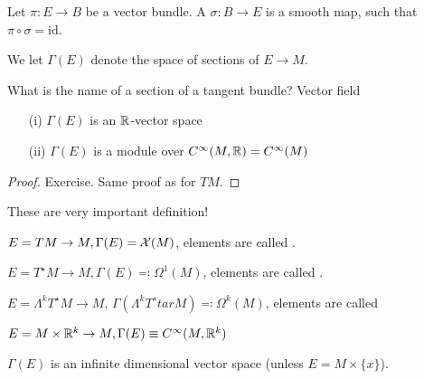 \begin{definition*}
    Let \(\pi:E\to B\) be a vector bundle. A  \(\sigma:B\to E\) is a 
    smooth map, such that \(\pi\circ \sigma=\text{id}\).
\end{definition*}
We let \(\Gamma(E)\) denote the space of sections of \(E \to M\). 

What is the name of a section of a tangent bundle? Vector field %

\begin{lemma}\label{lem:8.5}
    \begin{enumerate}
        \item[(i)] \(\Gamma(E)\) is an \(\mathbb{R}\)-vector space 
        \item[(ii)] \(\Gamma(E)\) is a module over \(C^\infty(M,\mathbb{R})=C^\infty(M)\)  
    \end{enumerate}
\end{lemma}

\begin{proof}
    Exercise. Same proof as for \(TM\).
\end{proof}

These are very important definition!

\begin{example}
    \(E=TM\to M,\Gamma(E)=\mathcal{X}(M)\), elements are called .
\end{example}

\begin{example}
    \(E=T^\star M\to M,\Gamma(E)\eqqcolon \Omega^1(M)\), elements are called .
\end{example}

\begin{example}
    \(E=\Lambda^k T^\star M \to M\), \(\Gamma(\Lambda^k T^star M)\eqqcolon \Omega^k(M)\), elements are called 
\end{example}

\begin{example}
    \(E=M\times \mathbb{R}^k\to M, \Gamma(E)\equiv C^\infty(M,\mathbb{R}^k)\)
\end{example}

\begin{remark}
    \(\Gamma(E)\) is an infinite dimensional vector space (unless \(E=M\times \{x\}\)).
\end{remark}

